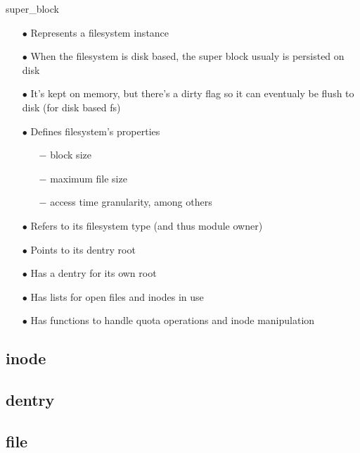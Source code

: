 \documentclass{beamer}
\begin{document}
\begin{frame}{super\_block}
	
	\begin{itemize}[<+->]

		\item[$\bullet$]{Represents a filesystem instance}
		\item[$\bullet$]{When the filesystem is disk based, the super block usualy is persisted on disk}		
		\item[$\bullet$]{It's kept on memory, but there's a dirty flag so it can eventualy be flush to disk (for disk based fs)}
		\item[$\bullet$]{Defines filesystem's properties}
			\begin{itemize}
				\item[$-$]{block size}
				\item[$-$]{maximum file size}
				\item[$-$]{access time granularity, among others}
			\end{itemize}	
		
		\item[$\bullet$]{Refers to its filesystem type (and thus module owner)}
		\item[$\bullet$]{Points to its dentry root}
		\item[$\bullet$]{Has a dentry for its own root}
		\item[$\bullet$]{Has lists for open files and inodes in use}
		\item[$\bullet$]{Has functions to handle quota operations and inode manipulation}
		
	\end{itemize}

\end{frame}

\subsection{inode}

\subsection{dentry}

\subsection{file}

\end{document}
